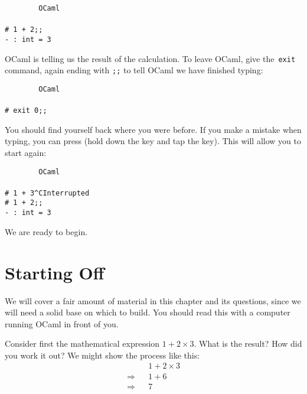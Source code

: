 \documentclass[]{book}
\newcommand{\smspace}{\vspace{4mm}}
\begin{document}
\smspace
\noindent\verb!        OCaml!\\
\noindent\\
\noindent\verb!# 1 + 2;;!\\
\noindent\verb!- : int = 3!
\smspace

\noindent OCaml is telling us the result of the calculation. To leave OCaml, give the \,\texttt{exit\!}\, command, again ending with \verb!;;! to tell OCaml we have finished typing:

\smspace
\noindent\verb!        OCaml!\\
\noindent\\
\noindent\verb!# exit 0;;!
\smspace

{\setlength\fboxsep{1.75pt}%

\noindent You should find yourself back where you were before. If you make a mistake when typing, you can press  (hold down the  key and tap the  key). This will allow you to start again:

}

\smspace
\noindent\verb!        OCaml!\\
\noindent\\
\noindent\verb!# 1 + 3^CInterrupted!\\
\noindent\verb!# 1 + 2;;!\\
\noindent\verb!- : int = 3!
\smspace

\noindent We are ready to begin.

\mainmatter

\pagestyle{fancy}
\chapter{Starting Off}
\label{startingoff}
We will cover a fair amount of material in this chapter and its questions, since we will need a solid base on which to build. You should read this with a computer running OCaml in front of you.

Consider first the mathematical  expression $1 + 2 \times 3$. What is the result? How did you work it out? We might show the process like this:
\begin{eqnarray*}
 & & 1 + 2 \times 3 \\
 \Longrightarrow & & 1 + 6 \\
 \Longrightarrow & & 7
\end{eqnarray*}
\end{document}

